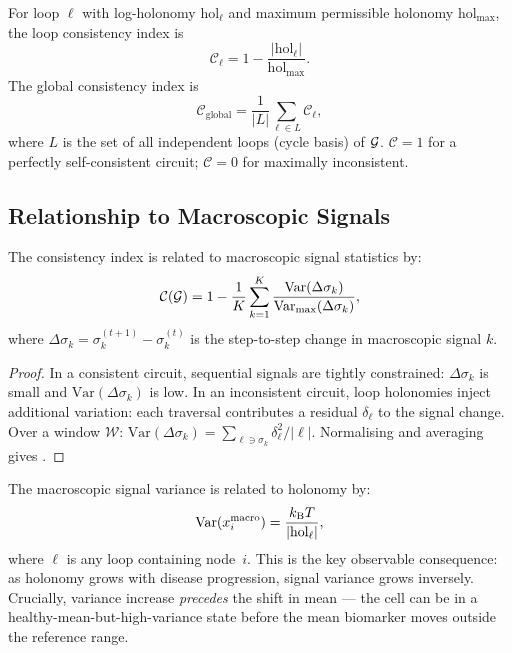 \begin{definition}
\label{def:loop-consistency}
For loop $\ell$ with log-holonomy $\mathrm{hol}_\ell$ and maximum
permissible holonomy $\mathrm{hol}_{\max}$, the loop consistency index is
\begin{equation}
  \mathcal{C}_\ell
  = 1 - \frac{|\mathrm{hol}_\ell|}{\mathrm{hol}_{\max}}.
  \label{eq:loop-consistency}
\end{equation}
The global consistency index is
\begin{equation}
  \mathcal{C}_{\mathrm{global}}
  = \frac{1}{|L|}\sum_{\ell \in L} \mathcal{C}_\ell,
  \label{eq:global-consistency}
\end{equation}
where $L$ is the set of all independent loops (cycle basis) of $\mathcal{G}$.
$\mathcal{C} = 1$ for a perfectly self-consistent circuit;
$\mathcal{C} = 0$ for maximally inconsistent.
\end{definition}

\subsection{Relationship to Macroscopic Signals}

\begin{theorem}
\label{thm:signal-consistency}
The consistency index is related to macroscopic signal statistics by:
\begin{equation}
  \mathcal{C}(\mathcal{G})
  = 1 - \frac{1}{K} \sum_{k=1}^{K}
    \frac{\mathrm{Var}(\Delta\sigma_k)}{\mathrm{Var}_{\max}(\Delta\sigma_k)},
  \label{eq:signal-consistency}
\end{equation}
where $\Delta\sigma_k = \sigma_k^{(t+1)} - \sigma_k^{(t)}$ is the
step-to-step change in macroscopic signal $k$.
\end{theorem}

\begin{proof}
In a consistent circuit, sequential signals are tightly constrained:
$\Delta\sigma_k$ is small and $\mathrm{Var}(\Delta\sigma_k)$ is low.
In an inconsistent circuit, loop holonomies inject additional variation:
each traversal contributes a residual $\delta_\ell$ to the signal change.
Over a window $\mathcal{W}$:
$\mathrm{Var}(\Delta\sigma_k) = \sum_{\ell \ni \sigma_k} \delta_\ell^2/|\ell|$.
Normalising and averaging gives .
\end{proof}

The macroscopic signal variance is related to holonomy by:
\begin{equation}
  \mathrm{Var}\!\left(x_i^{\mathrm{macro}}\right)
  = \frac{k_{\mathrm{B}} T}{|\mathrm{hol}_\ell|},
  \label{eq:variance-holonomy}
\end{equation}
where $\ell$ is any loop containing node~$i$.  This is the key observable
consequence: as holonomy grows with disease progression, signal variance
grows inversely.  Crucially, variance increase \emph{precedes} the shift
in mean --- the cell can be in a healthy-mean-but-high-variance state
before the mean biomarker moves outside the reference range.

